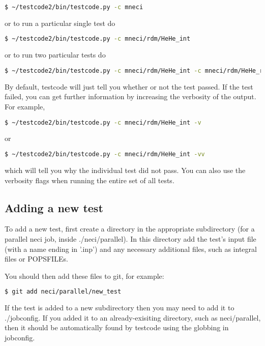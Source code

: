 \documentclass[a4paper,notitlepage,dvipsnames]{scrreprt}
\begin{document}
{{{\begin{lstlisting}[language=bash]
    $ ~/testcode2/bin/testcode.py -c mneci
\end{lstlisting}

or to run a particular single test do

\begin{lstlisting}[language=bash]
    $ ~/testcode2/bin/testcode.py -c mneci/rdm/HeHe_int
\end{lstlisting}

or to run two particular tests do

\begin{lstlisting}[language=bash]
    $ ~/testcode2/bin/testcode.py -c mneci/rdm/HeHe_int -c mneci/rdm/HeHe_real
\end{lstlisting}

By default, testcode will just tell you whether or not the test passed.
If the test failed, you can get further information by increasing the
verbosity of the output. For example,

\begin{lstlisting}[language=bash]
    $ ~/testcode2/bin/testcode.py -c mneci/rdm/HeHe_int -v
\end{lstlisting}

or

\begin{lstlisting}[language=bash]
    $ ~/testcode2/bin/testcode.py -c mneci/rdm/HeHe_int -vv
\end{lstlisting}

which will tell you why the individual test did not pass. You can also
use the verbosity flags when running the entire set of all tests.

\subsection{Adding a new test}
To add a new test, first create a directory in the appropriate subdirectory
(for a parallel neci job, inside ./neci/parallel). In this directory add the
test's input file (with a name ending in '.inp') and any necessary additional
files, such as integral files or POPSFILEs.

You should then add these files to git, for example:

\begin{lstlisting}[language=bash]
    $ git add neci/parallel/new_test
\end{lstlisting}

If the test is added to a new subdirectory then you may need to add it to
./jobconfig. If you added it to an already-exisiting directory, such as
neci/parallel, then it should be automatically found by testcode using the
globbing in jobconfig.

}}}
\end{document}
